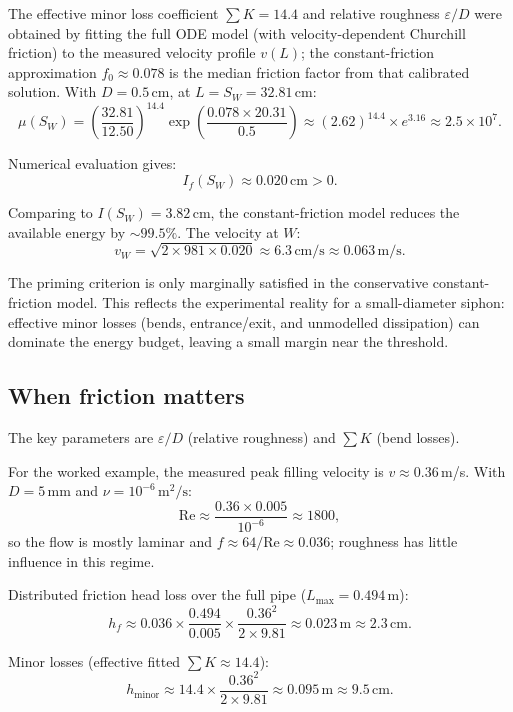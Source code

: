\documentclass[11pt]{article}
\begin{document}
The effective minor loss coefficient $\sum K = 14.4$ and relative roughness $\varepsilon/D$ were obtained by fitting the full ODE model (with velocity-dependent Churchill friction) to the measured velocity profile $v(L)$; the constant-friction approximation $f_0 \approx 0.078$ is the median friction factor from that calibrated solution. With $D = 0.5$\,cm, at $L = S_W = 32.81$\,cm:
\[
  \mu(S_W) = \left(\frac{32.81}{12.50}\right)^{14.4} \exp\left(\frac{0.078 \times 20.31}{0.5}\right) \approx (2.62)^{14.4} \times e^{3.16} \approx 2.5\times 10^{7}.
\]

Numerical evaluation gives:
\begin{equation}
  I_f(S_W) \approx 0.020\,\text{cm} > 0.
  \label{eq:I-f-value}
\end{equation}

Comparing to $I(S_W) = 3.82$\,cm, the constant-friction model reduces the available energy by $\sim 99.5\%$. The velocity at $W$:
\[
  v_W = \sqrt{2 \times 981 \times 0.020} \approx 6.3\,\text{cm/s} \approx 0.063\,\text{m/s}.
\]

The priming criterion is only marginally satisfied in the conservative constant-friction model. This reflects the experimental reality for a small-diameter siphon: effective minor losses (bends, entrance/exit, and unmodelled dissipation) can dominate the energy budget, leaving a small margin near the threshold.

\subsection{When friction matters}

The key parameters are $\varepsilon/D$ (relative roughness) and $\sum K$ (bend losses).

For the worked example, the measured peak filling velocity is $v \approx 0.36$\,m/s. With $D = 5$\,mm and $\nu = 10^{-6}\,\text{m}^2/\text{s}$:
\[
  \text{Re} \approx \frac{0.36 \times 0.005}{10^{-6}} \approx 1800,
\]
so the flow is mostly laminar and $f \approx 64/\text{Re} \approx 0.036$; roughness has little influence in this regime.

Distributed friction head loss over the full pipe ($L_{\max} = 0.494$\,m):
\[
  h_f \approx 0.036 \times \frac{0.494}{0.005} \times \frac{0.36^2}{2 \times 9.81} \approx 0.023\,\text{m} \approx 2.3\,\text{cm}.
\]

Minor losses (effective fitted $\sum K \approx 14.4$):
\[
  h_{\text{minor}} \approx 14.4 \times \frac{0.36^2}{2 \times 9.81} \approx 0.095\,\text{m} \approx 9.5\,\text{cm}.
\]
\end{document}
